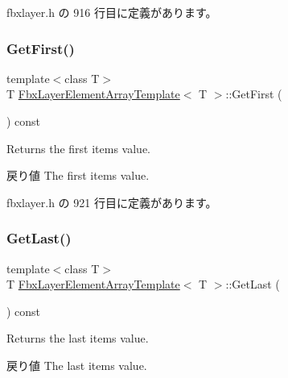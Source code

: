  fbxlayer.\+h の 916 行目に定義があります。

\mbox{\label{class_fbx_layer_element_array_template_a76cc225d2f45a40ef77ecce9bb1dd971}} 
\subsubsection{\texorpdfstring{Get\+First()}{GetFirst()}}
{\footnotesize\ttfamily template$<$class T$>$ \\
T \hyperlink{class_fbx_layer_element_array_template}{Fbx\+Layer\+Element\+Array\+Template}$<$ T $>$\+::Get\+First (\begin{DoxyParamCaption}{ }\end{DoxyParamCaption}) const\hspace{0.3cm}{\ttfamily [inline]}}

Returns the first item\textquotesingle{}s value. \begin{DoxyReturn}{戻り値}
The first item\textquotesingle{}s value. 
\end{DoxyReturn}


 fbxlayer.\+h の 921 行目に定義があります。

\mbox{\label{class_fbx_layer_element_array_template_a3dc0296d72de9a084d5afedaba6f5900}} 
\subsubsection{\texorpdfstring{Get\+Last()}{GetLast()}}
{\footnotesize\ttfamily template$<$class T$>$ \\
T \hyperlink{class_fbx_layer_element_array_template}{Fbx\+Layer\+Element\+Array\+Template}$<$ T $>$\+::Get\+Last (\begin{DoxyParamCaption}{ }\end{DoxyParamCaption}) const\hspace{0.3cm}{\ttfamily [inline]}}

Returns the last item\textquotesingle{}s value. \begin{DoxyReturn}{戻り値}
The last item\textquotesingle{}s value. 
\end{DoxyReturn}


